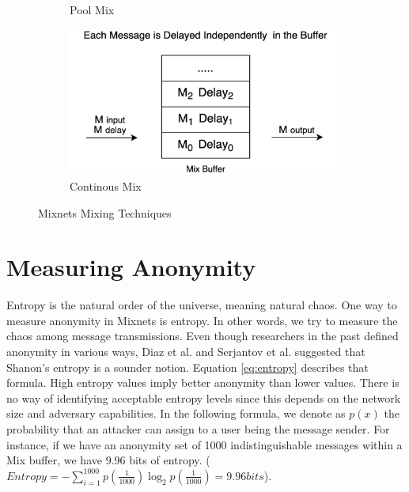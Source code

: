 \documentclass[logo,msc,cyber]{infthesis}   %
\begin{document}
\begin{figure}[h!]
\begin{subfigure}[b]{0.45\textwidth}
        \caption{Pool Mix}
        \label{fig:pool-mix}
    \end{subfigure}
    \hfill
    \begin{subfigure}[b]{0.45\textwidth}
        \centering
        \includegraphics[width=\textwidth]{figures/mixing_techniques/continues.png}
        \caption{Continous Mix}
        \label{fig:continues-mix}
    \end{subfigure}
       \caption{Mixnets Mixing Techniques}
       \label{fig:mixnets-mixing-techniques}
 \end{figure}

\section{Measuring Anonymity}

Entropy is the natural order of the universe, meaning natural chaos. One way to
measure anonymity in Mixnets is entropy. In other words, we try to measure the
chaos among message transmissions. Even though researchers in the past defined
anonymity in various ways\cite{pfitzmann2001anonymity,
reiter1998crowds,diaz2006anonymity}, Diaz et al.\cite{diaz2002towards} and
Serjantov et al.\cite{serjantov2002towards} suggested that Shanon's
entropy\cite{entropy} is a sounder notion. Equation \ref{eq:entropy} describes
that formula. High entropy values imply better anonymity than lower values.
There is no way of identifying acceptable entropy levels since this depends on
the network size and adversary capabilities. In the following formula, we denote
as $p(x)$ the probability that an attacker can assign to a user being the
message sender. For instance, if we have an anonymity set of 1000
indistinguishable messages within a Mix buffer, we have 9.96 bits of entropy.
($Entropy = -\sum_{i = 1}^{1000}p(\frac{1}{1000}) \log_2p(\frac{1}{1000}) = 9.96
bits$). 
\end{document}
